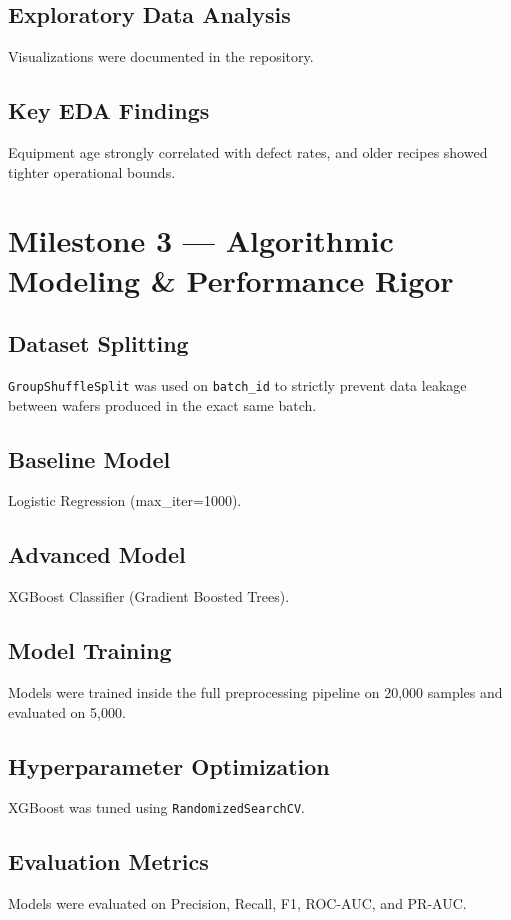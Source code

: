 \documentclass[12pt, a4paper]{article}
\begin{document}
\subsection{Exploratory Data Analysis}
Visualizations were documented in the repository.

\subsection{Key EDA Findings}
Equipment age strongly correlated with defect rates, and older recipes showed tighter operational bounds.

\section{Milestone 3 — Algorithmic Modeling \& Performance Rigor}
\subsection{Dataset Splitting}
\texttt{GroupShuffleSplit} was used on \texttt{batch\_id} to strictly prevent data leakage between wafers produced in the exact same batch.

\subsection{Baseline Model}
Logistic Regression (max\_iter=1000).

\subsection{Advanced Model}
XGBoost Classifier (Gradient Boosted Trees).

\subsection{Model Training}
Models were trained inside the full preprocessing pipeline on 20,000 samples and evaluated on 5,000.

\subsection{Hyperparameter Optimization}
XGBoost was tuned using \texttt{RandomizedSearchCV}.

\subsection{Evaluation Metrics}
Models were evaluated on Precision, Recall, F1, ROC-AUC, and PR-AUC.
\end{document}
